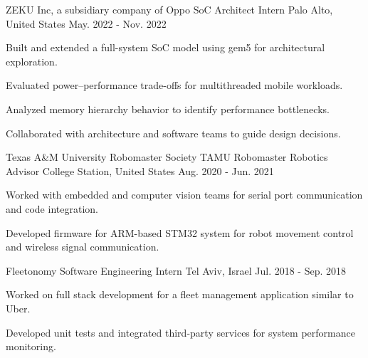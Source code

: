\begin{cventries}
    \cventry
    {ZEKU Inc, a subsidiary company of Oppo} %
    {SoC Architect Intern} %
    {Palo Alto, United States} %
    {May. 2022 - Nov. 2022} %
    {
      \begin{cvitems} %
        \item {Built and extended a full-system SoC model using gem5 for architectural exploration.}
        \item {Evaluated power–performance trade-offs for multithreaded mobile workloads.}
        \item {Analyzed memory hierarchy behavior to identify performance bottlenecks.}        
        \item {Collaborated with architecture and software teams to guide design decisions.}
      \end{cvitems}
    }
    
  \cventry
    {Texas A\&M University Robomaster Society} %
    {TAMU Robomaster Robotics Advisor} %
    {College Station, United States} %
    {Aug. 2020 - Jun. 2021} %
    {
      \begin{cvitems} %
        \item {Worked with embedded and computer vision teams for serial port communication and code integration.}
        \item {Developed firmware for ARM-based STM32 system for robot movement control and wireless signal communication.}
      \end{cvitems}
    }


  \cventry
    {Fleetonomy} %
    {Software Engineering Intern} %
    {Tel Aviv, Israel} %
    {Jul. 2018 - Sep. 2018} %
    {
      \begin{cvitems} %
        \item {Worked on full stack development for a fleet management application similar to Uber.}
        \item {Developed unit tests and integrated third-party services for system performance monitoring.}
      \end{cvitems}
    }
    
\end{cventries}
